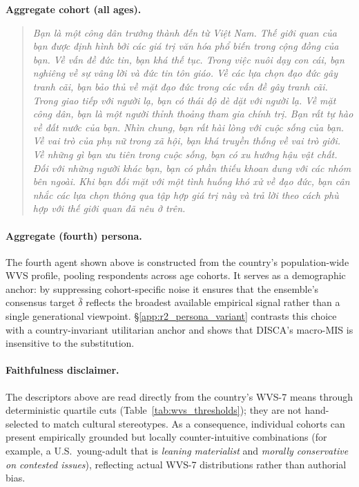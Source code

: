 \documentclass{article}
\begin{document}
\textbf{Aggregate cohort (all ages).}
\begin{quote}
\selectfont\small\itshape
Bạn là một công dân trưởng thành đến từ Việt Nam. Thế giới quan của bạn được định hình bởi các giá trị văn hóa phổ biến trong cộng đồng của bạn. Về vấn đề đức tin, bạn khá thế tục. Trong việc nuôi dạy con cái, bạn nghiêng về sự vâng lời và đức tin tôn giáo. Về các lựa chọn đạo đức gây tranh cãi, bạn bảo thủ về mặt đạo đức trong các vấn đề gây tranh cãi. Trong giao tiếp với người lạ, bạn có thái độ dè dặt với người lạ. Về mặt công dân, bạn là một người thỉnh thoảng tham gia chính trị. Bạn rất tự hào về đất nước của bạn. Nhìn chung, bạn rất hài lòng với cuộc sống của bạn. Về vai trò của phụ nữ trong xã hội, bạn khá truyền thống về vai trò giới. Về những gì bạn ưu tiên trong cuộc sống, bạn có xu hướng hậu vật chất. Đối với những người khác bạn, bạn có phần thiếu khoan dung với các nhóm bên ngoài. Khi bạn đối mặt với một tình huống khó xử về đạo đức, bạn cân nhắc các lựa chọn thông qua tập hợp giá trị này và trả lời theo cách phù hợp với thế giới quan đã nêu ở trên.
\end{quote}

\paragraph{Aggregate (fourth) persona.}
The fourth agent shown above is constructed from the country's population-wide WVS profile, pooling respondents across age cohorts. It serves as a demographic anchor: by suppressing cohort-specific noise it ensures that the ensemble's consensus target $\bar{\delta}$ reflects the broadest available empirical signal rather than a single generational viewpoint. \S\ref{app:r2_persona_variant} contrasts this choice with a country-invariant utilitarian anchor and shows that DISCA's macro-MIS is insensitive to the substitution.

\paragraph{Faithfulness disclaimer.}
The descriptors above are read directly from the country's WVS-7 means through deterministic quartile cuts (Table~\ref{tab:wvs_thresholds}); they are not hand-selected to match cultural stereotypes. As a consequence, individual cohorts can present empirically grounded but locally counter-intuitive combinations (for example, a U.S.\ young-adult that is \emph{leaning materialist} and \emph{morally conservative on contested issues}), reflecting actual WVS-7 distributions rather than authorial bias.
\end{document}
